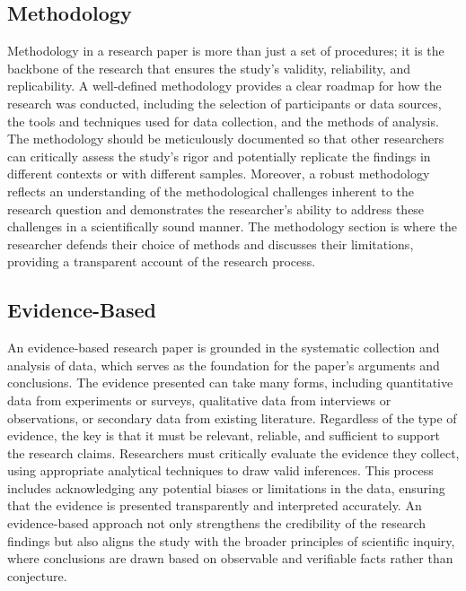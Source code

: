 \documentclass[
]{book}
\begin{document}
\subsection*{Methodology}\label{methodology}

Methodology in a research paper is more than just a set of procedures; it is the backbone of the research that ensures the study's validity, reliability, and replicability. A well-defined methodology provides a clear roadmap for how the research was conducted, including the selection of participants or data sources, the tools and techniques used for data collection, and the methods of analysis. The methodology should be meticulously documented so that other researchers can critically assess the study's rigor and potentially replicate the findings in different contexts or with different samples. Moreover, a robust methodology reflects an understanding of the methodological challenges inherent to the research question and demonstrates the researcher's ability to address these challenges in a scientifically sound manner. The methodology section is where the researcher defends their choice of methods and discusses their limitations, providing a transparent account of the research process.

\subsection*{Evidence-Based}\label{evidence-based}

An evidence-based research paper is grounded in the systematic collection and analysis of data, which serves as the foundation for the paper's arguments and conclusions. The evidence presented can take many forms, including quantitative data from experiments or surveys, qualitative data from interviews or observations, or secondary data from existing literature. Regardless of the type of evidence, the key is that it must be relevant, reliable, and sufficient to support the research claims. Researchers must critically evaluate the evidence they collect, using appropriate analytical techniques to draw valid inferences. This process includes acknowledging any potential biases or limitations in the data, ensuring that the evidence is presented transparently and interpreted accurately. An evidence-based approach not only strengthens the credibility of the research findings but also aligns the study with the broader principles of scientific inquiry, where conclusions are drawn based on observable and verifiable facts rather than conjecture.
\end{document}
